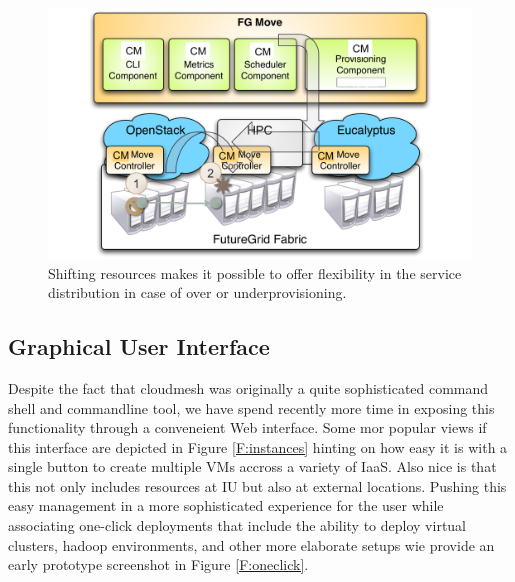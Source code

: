 \begin{figure}[h!]
  \centering
    \includegraphics[width=1.0\textwidth]{images/shift2.pdf}
  \caption{Shifting resources makes it possible to offer flexibility
    in the service distribution in case of over or underprovisioning.}\label{F:shift}
\end{figure}

\subsection{Graphical User Interface}

Despite the fact that cloudmesh was originally a quite sophisticated
command shell and commandline tool, we have spend recently more time
in exposing this functionality through a conveneient Web
interface. Some mor popular views if this interface are depicted in
Figure \ref{F:instances} hinting on how easy it is with a single
button to create multiple VMs accross a variety of IaaS. Also nice is
that this not only includes resources at IU but also at external
locations. Pushing this easy management in a more sophisticated
experience for the user while associating one-click deployments that
include the ability to deploy virtual clusters, hadoop environments,
and other more elaborate setups wie provide an early prototype
screenshot in Figure \ref{F:oneclick}.

